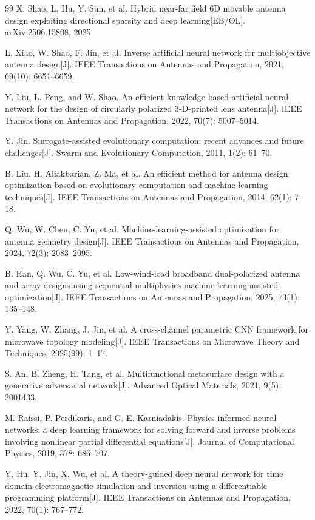 \documentclass[UTF8,a4paper,12pt]{ctexart}
\begin{document}
\begin{thebibliography}{99}
 X. Shao, L. Hu, Y. Sun, et al. Hybrid near-far field 6D movable antenna design exploiting directional sparsity and deep learning[EB/OL]. arXiv:2506.15808, 2025.

 L. Xiao, W. Shao, F. Jin, et al. Inverse artificial neural network for multiobjective antenna design[J]. IEEE Transactions on Antennas and Propagation, 2021, 69(10): 6651--6659.

 Y. Liu, L. Peng, and W. Shao. An efficient knowledge-based artificial neural network for the design of circularly polarized 3-D-printed lens antenna[J]. IEEE Transactions on Antennas and Propagation, 2022, 70(7): 5007--5014.

 Y. Jin. Surrogate-assisted evolutionary computation: recent advances and future challenges[J]. Swarm and Evolutionary Computation, 2011, 1(2): 61--70.

 B. Liu, H. Aliakbarian, Z. Ma, et al. An efficient method for antenna design optimization based on evolutionary computation and machine learning techniques[J]. IEEE Transactions on Antennas and Propagation, 2014, 62(1): 7--18.

 Q. Wu, W. Chen, C. Yu, et al. Machine-learning-assisted optimization for antenna geometry design[J]. IEEE Transactions on Antennas and Propagation, 2024, 72(3): 2083--2095.

 B. Han, Q. Wu, C. Yu, et al. Low-wind-load broadband dual-polarized antenna and array designs using sequential multiphysics machine-learning-assisted optimization[J]. IEEE Transactions on Antennas and Propagation, 2025, 73(1): 135--148.

 Y. Yang, W. Zhang, J. Jin, et al. A cross-channel parametric CNN framework for microwave topology modeling[J]. IEEE Transactions on Microwave Theory and Techniques, 2025(99): 1--17.

 S. An, B. Zheng, H. Tang, et al. Multifunctional metasurface design with a generative adversarial network[J]. Advanced Optical Materials, 2021, 9(5): 2001433.

 M. Raissi, P. Perdikaris, and G. E. Karniadakis. Physics-informed neural networks: a deep learning framework for solving forward and inverse problems involving nonlinear partial differential equations[J]. Journal of Computational Physics, 2019, 378: 686--707.

 Y. Hu, Y. Jin, X. Wu, et al. A theory-guided deep neural network for time domain electromagnetic simulation and inversion using a differentiable programming platform[J]. IEEE Transactions on Antennas and Propagation, 2022, 70(1): 767--772.

\end{thebibliography}
\end{document}
